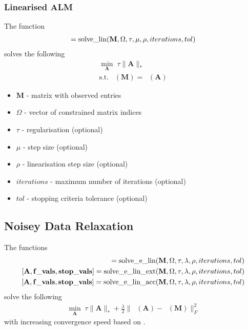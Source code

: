 \documentclass{article}
\DeclareMathOperator*{\pro}{\mathcal P_{\Omega}}
\begin{document}
\subsubsection{Linearised ALM}

The function
\begin{align}
[ \mathbf A, \mathbf{f\_vals}, \mathbf{stop\_vals} ] = \text{solve\_lin}( \mathbf M, \Omega, \tau, \mu, \rho, iterations, tol ) \notag 
\end{align}
solves the following
\begin{align}
\min_{\mathbf A} \; \tau \| \mathbf A \|_* \\
\text{s.t.} \; \pro (\mathbf M) = \pro (\mathbf A) \nonumber 
\end{align}

\begin{itemize}
\item $\mathbf M$ - matrix with observed entries
\item $\Omega$ - vector of constrained matrix indices
\item $\tau$ - regularisation (optional)
\item $\mu$ - step size (optional)
\item $\rho$ - linearisation step size (optional)
\item $iterations$ - maximum number of iterations (optional)
\item $tol$ - stopping criteria tolerance (optional)
\end{itemize}

\subsection{Noisey Data Relaxation}

The functions
\begin{align}
[ \mathbf A, \mathbf{f\_vals}, \mathbf{stop\_vals} ] = \text{solve\_e\_lin}( \mathbf M, \Omega, \tau, \lambda, \rho, iterations, tol ) \notag \\
[ \mathbf A, \mathbf{f\_vals}, \mathbf{stop\_vals} ] = \text{solve\_e\_lin\_ext}( \mathbf M, \Omega, \tau, \lambda, \rho, iterations, tol ) \notag \\
[ \mathbf A, \mathbf{f\_vals}, \mathbf{stop\_vals} ] = \text{solve\_e\_lin\_acc}( \mathbf M, \Omega, \tau, \lambda, \rho, iterations, tol )\notag 
\end{align}
solve the following
\begin{align}
\min_{\mathbf A} \; \tau \| \mathbf A \|_*  +  \frac{\lambda}{2} \| \mathbf{ \pro (A) - \pro (M)  } \|^2_F 
\end{align}
with increasing convergence speed based on \cite{ji2009accelerated}.
\end{document}
